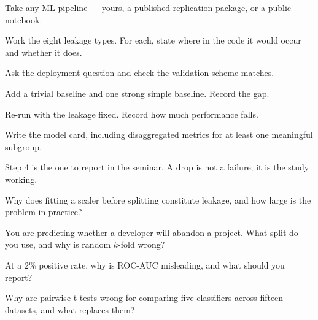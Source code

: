 \begin{lab}
Take any ML pipeline --- yours, a published replication package, or a public
notebook.

\begin{tightnum}
  \item Work the eight leakage types. For each, state where in the code it
    would occur and whether it does.
  \item Ask the deployment question and check the validation scheme matches.
  \item Add a trivial baseline and one strong simple baseline. Record the gap.
  \item Re-run with the leakage fixed. Record how much performance falls.
  \item Write the model card, including disaggregated metrics for at least one
    meaningful subgroup.
\end{tightnum}

\medskip
Step 4 is the one to report in the seminar. A drop is not a failure; it is the
study working.
\end{lab}

\begin{checkpoint}
\begin{tightnum}
  \item Why does fitting a scaler before splitting constitute leakage, and how
    large is the problem in practice?
  \item You are predicting whether a developer will abandon a project. What
    split do you use, and why is random $k$-fold wrong?
  \item At a 2\% positive rate, why is ROC-AUC misleading, and what should you
    report?
  \item Why are pairwise t-tests wrong for comparing five classifiers across
    fifteen datasets, and what replaces them?
\end{tightnum}
\end{checkpoint}

